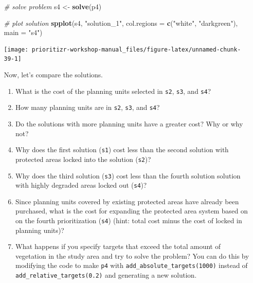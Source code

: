 \documentclass[12pt,]{book}
\newenvironment{Shaded}{\begin{snugshade}}{\end{snugshade}}
\newcommand{\KeywordTok}[1]{\textcolor[rgb]{0.13,0.29,0.53}{\textbf{#1}}}
\newcommand{\DataTypeTok}[1]{\textcolor[rgb]{0.13,0.29,0.53}{#1}}
\newcommand{\StringTok}[1]{\textcolor[rgb]{0.31,0.60,0.02}{#1}}
\newcommand{\CommentTok}[1]{\textcolor[rgb]{0.56,0.35,0.01}{\textit{#1}}}
\newcommand{\NormalTok}[1]{#1}
\providecommand{\tightlist}{%
  \setlength{\itemsep}{0pt}\setlength{\parskip}{0pt}}
\let\BeginKnitrBlock\begin \let\EndKnitrBlock\end
\begin{document}
\begin{Shaded}
\begin{Highlighting}[]
\CommentTok{# solve problem}
\NormalTok{s4 <-}\StringTok{ }\KeywordTok{solve}\NormalTok{(p4)}

\CommentTok{# plot solution}
\KeywordTok{spplot}\NormalTok{(s4, }\StringTok{"solution_1"}\NormalTok{, }\DataTypeTok{col.regions =} \KeywordTok{c}\NormalTok{(}\StringTok{"white"}\NormalTok{, }\StringTok{"darkgreen"}\NormalTok{), }\DataTypeTok{main =} \StringTok{"s4"}\NormalTok{)}
\end{Highlighting}
\end{Shaded}

\begin{center}\texttt{[image: prioritizr-workshop-manual\_files/figure-latex/unnamed-chunk-39-1]} \end{center}

\clearpage

Now, let's compare the solutions.

\BeginKnitrBlock{rmdquestion}
\begin{enumerate}
\def\labelenumi{\arabic{enumi}.}
\tightlist
\item
  What is the cost of the planning units selected in \texttt{s2},
  \texttt{s3}, and \texttt{s4}?
\item
  How many planning units are in \texttt{s2}, \texttt{s3}, and
  \texttt{s4}?
\item
  Do the solutions with more planning units have a greater cost? Why or
  why not?
\item
  Why does the first solution (\texttt{s1}) cost less than the second
  solution with protected areas locked into the solution (\texttt{s2})?
\item
  Why does the third solution (\texttt{s3}) cost less than the fourth
  solution solution with highly degraded areas locked out (\texttt{s4})?
\item
  Since planning units covered by existing protected areas have already
  been purchased, what is the cost for expanding the protected area
  system based on on the fourth prioritization (\texttt{s4}) (hint:
  total cost minus the cost of locked in planning units)?
\item
  What happens if you specify targets that exceed the total amount of
  vegetation in the study area and try to solve the problem? You can do
  this by modifying the code to make \texttt{p4} with
  \texttt{add\_absolute\_targets(1000)} instead of
  \texttt{add\_relative\_targets(0.2)} and generating a new solution.
\end{enumerate}
\EndKnitrBlock{rmdquestion}
\end{document}
